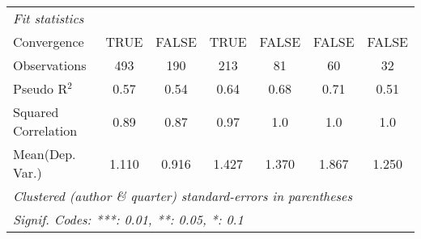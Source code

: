 \begin{tabular}{lcccccc}
   \midrule
   \emph{Fit statistics}\\
   Convergence                                                &TRUE          & FALSE         & TRUE         & FALSE          & FALSE        & FALSE\\  
   Observations                                               & 493          & 190           & 213          & 81             & 60           & 32\\  
   Pseudo R$^2$                                               & 0.57         & 0.54          & 0.64         & 0.68           & 0.71         & 0.51\\  
   Squared Correlation                                        & 0.89         & 0.87          & 0.97         & 1.0            & 1.0          & 1.0\\  
Mean(Dep. Var.) & 1.110 & 0.916 & 1.427 & 1.370 & 1.867 & 1.250 \\
   \midrule \midrule
   \multicolumn{7}{l}{\emph{Clustered (author \& quarter) standard-errors in parentheses}}\\
   \multicolumn{7}{l}{\emph{Signif. Codes: ***: 0.01, **: 0.05, *: 0.1}}\\
\end{tabular}
\par\endgroup
